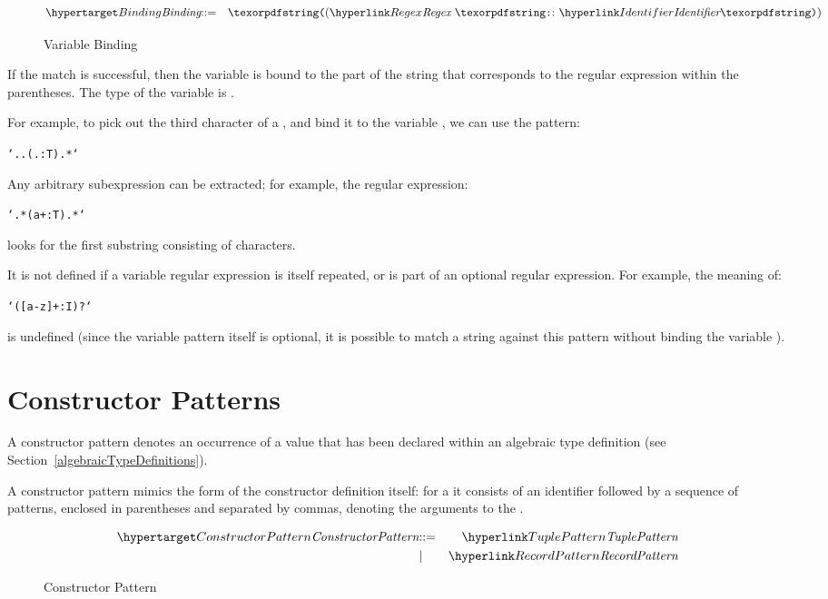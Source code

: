 \begin{figure}[htbp]
\begin{eqnarray*}
\ntDef{Binding}&\arrow&\q{(}\ntRef{Regex}\ \q{:}\ \ntRef{Identifier}\q{)}
\end{eqnarray*}
\caption{Variable Binding}
\label{ergexpBindingFig}
\end{figure}

If the match is successful, then the variable is bound to the part of the string that corresponds to the regular expression within the parentheses. The type of the variable is .

For example, to pick out the third character of a , and bind it to the variable , we can use the pattern:
\begin{alltt}
`..(.:T).*`
\end{alltt}
Any arbitrary subexpression can be extracted; for example, the regular expression:
\begin{alltt}
`.*(a+:T).*`
\end{alltt}
looks for the first substring consisting of  characters.
\begin{aside}
It is not defined if a variable regular expression is itself repeated, or is part of an optional regular expression. For example, the meaning of:
\begin{alltt}
`([a-z]+:I)?`
\end{alltt}
is undefined (since the variable pattern itself is optional, it is possible to match a string against this pattern without binding the variable ).
\end{aside}

\section{Constructor Patterns}
\label{tuplePattern}
A constructor pattern denotes an occurrence of a value that has been declared within an algebraic type definition (see Section~\vref{algebraicTypeDefinitions}). 

A constructor pattern mimics the form of the constructor definition itself: for a  it consists of an identifier followed by a sequence of patterns, enclosed in parentheses and separated by commas, denoting the arguments to the .

\begin{figure}[htbp]
\begin{eqnarray*}
\ntDef{ConstructorPattern}&\arrow&\ntRef{TuplePattern}\\
&\choice&\ntRef{RecordPattern}
\end{eqnarray*}
\caption{Constructor Pattern}
\label{constructorPtnFig}
\end{figure}

